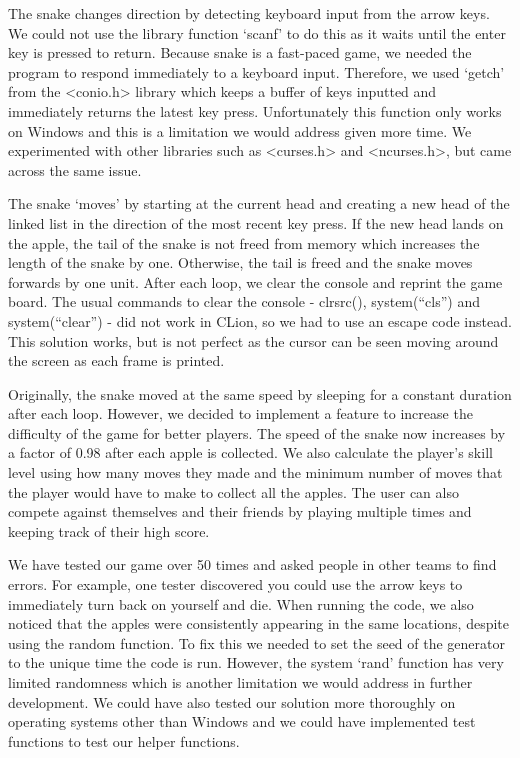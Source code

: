 \documentclass[11pt]{article}
\begin{document}
{}

{The snake changes direction by detecting keyboard input from the arrow
keys. We could not use the library function `scanf' to do this as it
waits until the enter key is pressed to return. Because snake is a
fast-paced game, we needed the program to respond immediately to a
keyboard input. Therefore, we used `getch' from the
\textless conio.h\textgreater{} library which keeps a buffer of keys
inputted and immediately returns the latest key press. Unfortunately
this function only works on Windows and this is a limitation we would
address given more time. We experimented with other libraries such as
\textless curses.h\textgreater{} and \textless ncurses.h\textgreater,
but came across the same issue.}

{}

{The snake `moves' by starting at the current head and creating a new
head of the linked list in the direction of the most recent key press.
If the new head lands on the apple, the tail of the snake is not freed
from memory which increases the length of the snake by one. Otherwise,
the tail is freed and the snake moves forwards by one unit. After each
loop, we clear the console and reprint the game board. The usual
commands to clear the console - }{clrsrc}{(), system(``}{cls''}{) and
system(``clear'') - did not work in CLion, so we had to use an escape
code instead. This solution works, but is not perfect as the cursor can
be seen moving around the screen as each frame is printed.}

{}

{Originally, the snake moved at the same speed by sleeping for a
constant duration after each loop. However, we decided to implement a
feature to increase the difficulty of the game for better players. The
speed of the snake now increases by a factor of 0.98 after each apple is
collected. We also calculate the player's skill level using how many
moves they made and the minimum number of moves that the player would
have to make to collect all the apples. The user can also compete
against themselves and their friends by playing multiple times and
keeping track of their high score.}

{}

{We have tested our game over 50 times and asked people in other teams
to find errors. For example, one tester discovered you could use the
arrow keys to immediately turn back on yourself and die. When running
the code, we also noticed that the apples were consistently appearing in
the same locations, despite using the random function. To fix this we
needed to set the seed of the generator to the unique time the code is
run. However, the system `rand' function has very limited randomness
which is another limitation we would address in further development. We
could have also tested our solution more thoroughly on operating systems
other than Windows and we could have implemented test functions to test
our helper functions.}
\end{document}
